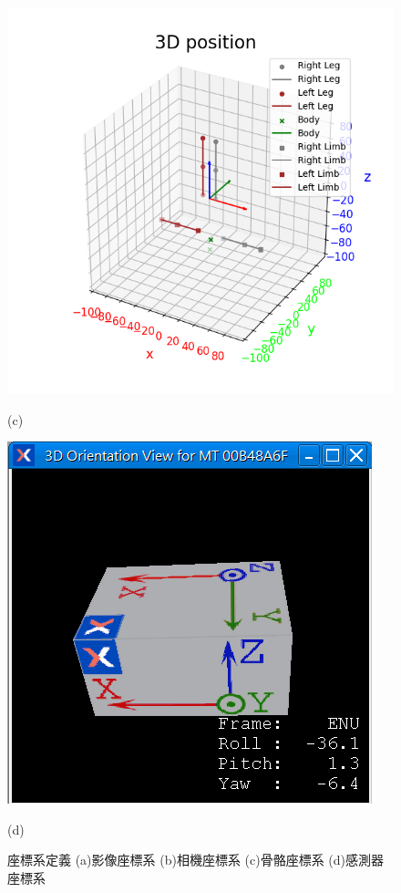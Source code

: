 \begin{figure}[!ht]
\begin{minipage}{.5\textwidth}
     \includegraphics[width=\linewidth]{figure/ch3_fig_skeleton_frame.png}
     \caption*{(c)}
   \end{minipage}%
   \begin{minipage}{.5\textwidth}
     \centering
     \includegraphics[width=\linewidth]{figure/ch3_fig_imu_frame.png}
     \caption*{(d)}
   \end{minipage}
   \captionsetup{justification=centering}
   \caption[座標系定義 (a)影像座標系 (b)相機座標系 (c)骨骼座標系 (d)感測器座標系]{座標系定義 (a)影像座標系 (b)相機座標系 (c)骨骼座標系 (d)感測器座標系}
   \label{ch3_fig_frame}
\end{figure}


